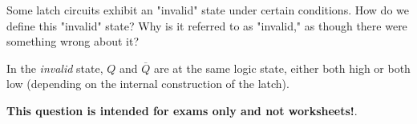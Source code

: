 

Some latch circuits exhibit an "invalid" state under certain conditions.  How do we define this "invalid" state?  Why is it referred to as "invalid," as though there were something wrong about it?







In the {\it invalid} state, $Q$ and $\overline{Q}$ are at the same logic state, either both high or both low (depending on the internal construction of the latch).







{\bf This question is intended for exams only and not worksheets!}.





